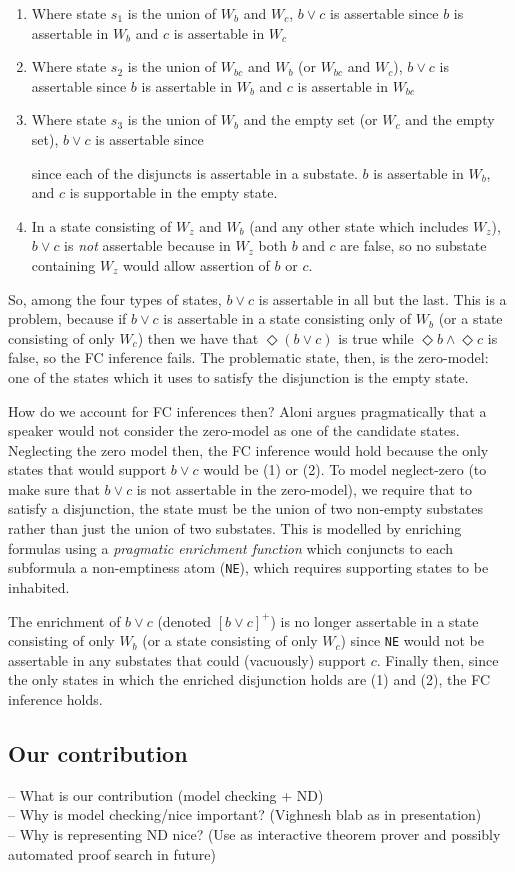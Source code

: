 \begin{enumerate}
\item Where state $s_1$ is the union of $W_b$ and $W_c$, $b\vee c$ is assertable since $b$ is assertable in $W_b$ and $c$ is assertable in $W_c$
\item Where state $s_2$ is the union of $W_{bc}$ and $W_b$ (or $W_{bc}$ and $W_c$), $b\vee c$ is assertable since $b$ is assertable in $W_b$ and $c$ is assertable in $W_{bc}$
\item Where state $s_3$ is the union of $W_b$ and the empty set (or $W_c$ and the empty set), $b\vee c$ is assertable since 


since each of the
disjuncts is assertable in a substate. $b$ is assertable in $W_b$, and $c$ is supportable in the empty state.
\item In a state consisting of $W_z$ and $W_b$ (and any other state which includes $W_z$), $b\vee c$ is
\textit{not} assertable because in $W_z$ both $b$ and $c$ are false, so no substate containing $W_z$ would allow assertion of $b$ or $c$.
\end{enumerate}

So, among the four types of states, $b\vee c$ is assertable in all but the last. This is a problem, because if
$b\vee c$ is assertable in a state consisting only of $W_b$ (or a state consisting of only $W_c$) then we have
that $\Diamond(b\vee c)$ is true while $\Diamond b \wedge \Diamond c$ is false, so the FC inference fails. The
problematic state, then, is the zero-model: one of the states which it uses to satisfy the disjunction is the
empty state.

How do we account for FC inferences then? Aloni argues pragmatically that a speaker would not consider the
zero-model as one of the candidate states. Neglecting the zero model then, the FC inference would hold
because the only states that would support $b\vee c$ would be (1) or (2). To model neglect-zero (to make
sure that $b\vee c$ is not assertable in the zero-model), we require that to satisfy a disjunction, the state
must be the union of two non-empty substates rather than just the union of two substates. 
This is modelled by enriching formulas using a \emph{pragmatic enrichment function} which conjuncts to each subformula a non-emptiness atom (\verb|NE|), which requires supporting states to be inhabited.

The enrichment of $b \vee c$ (denoted $[b\vee c]^+$) is no longer assertable in a state consisting of only $W_b$
(or a state consisting of only $W_c$) since \verb|NE| would not be assertable in any substates that could (vacuously) support $c$.
Finally then, since the only states in which the enriched disjunction holds are (1) and (2), the FC inference holds.

\subsection{Our contribution}
-- What is our contribution (model checking + ND)\\
-- Why is model checking/nice important? (Vighnesh blab as in presentation)\\
-- Why is representing ND nice? (Use as interactive theorem prover and possibly automated proof search in future)